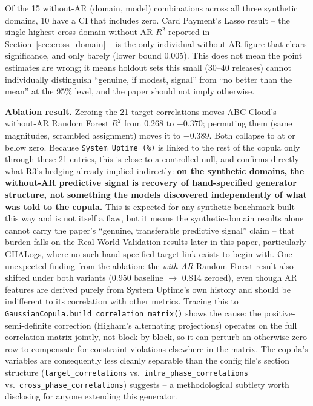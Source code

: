 \documentclass[technologies,article,submit,pdftex,moreauthors]{Definitions/mdpi}
\begin{document}
Of the 15 without-AR (domain, model) combinations across all three
synthetic domains, 10 have a CI that includes zero. Card Payment's Lasso
result -- the single highest cross-domain without-AR \(R^2\) reported in
Section~\ref{sec:cross_domain} -- is the only individual without-AR figure that clears
significance, and only barely (lower bound 0.005). This does not mean
the point estimates are wrong; it means holdout sets this small (30--40
releases) cannot individually distinguish ``genuine, if modest, signal''
from ``no better than the mean'' at the 95\% level, and the paper should
not imply otherwise.

\textbf{Ablation result.} Zeroing the 21 target correlations moves ABC
Cloud's without-AR Random Forest \(R^2\) from 0.268 to \(-0.370\);
permuting them (same magnitudes, scrambled assignment) moves it to
\(-0.389\). Both collapse to at or below zero. Because
\texttt{System\ Uptime\ (\%)} is linked to the rest of the copula only
through these 21 entries, this is close to a controlled null, and
confirms directly what R3's hedging already implied indirectly:
\textbf{on the synthetic domains, the without-AR predictive signal is
recovery of hand-specified generator structure, not something the models
discovered independently of what was told to the copula.} This is
expected for any synthetic benchmark built this way and is not itself a
flaw, but it means the synthetic-domain results alone cannot carry the
paper's ``genuine, transferable predictive signal'' claim -- that burden
falls on the Real-World Validation results later in this paper,
particularly GHALogs, where no such hand-specified target link exists to
begin with. One unexpected finding from the ablation: the \emph{with-AR}
Random Forest result also shifted under both variants (0.950 baseline
\(\to\) 0.814 zeroed), even though AR features are derived purely from
System Uptime's own history and should be indifferent to its correlation
with other metrics. Tracing this to
\texttt{GaussianCopula.build\_\allowbreak correlation\_\allowbreak matrix()} shows the cause:
the positive-semi-definite correction (Higham's alternating projections)
operates on the full correlation matrix jointly, not block-by-block, so
it can perturb an otherwise-zero row to compensate for constraint
violations elsewhere in the matrix. The copula's variables are
consequently less cleanly separable than the config file's section
structure (\texttt{target\_correlations}
vs.~\texttt{intra\_phase\_correlations}
vs.~\texttt{cross\_phase\_correlations}) suggests -- a methodological
subtlety worth disclosing for anyone extending this generator.
\end{document}
